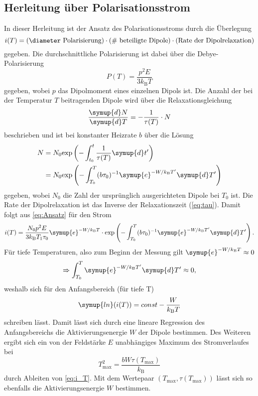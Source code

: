 \subsection{Herleitung über Polarisationsstrom}
In dieser Herleitung ist der Ansatz des Polarisationsstroms durch die Überlegung 
\begin{equation}
    \label{eq:Ansatz}
    i(T) = \text{(\diameter Polarisierung)} \cdot \text{(\# beteiligte Dipole)} \cdot \text{(Rate der Dipolrelaxation)}
\end{equation} 
gegeben.
Die durchschnittliche Polarisierung ist dabei über die Debye-Polarisierung
\begin{equation*}
    \label{eq:debye}
    P(T) = \frac{p^2 E}{3k_\text{B} T}
\end{equation*}
gegeben, wobei $p$ das Dipolmoment eines einzelnen Dipols ist. Die Anzahl der bei der Temperatur $T$ beitragenden Dipole wird über die Relaxationsgleichung 
\begin{equation*}
\frac{\symup{d}N}{\symup{d}T} = -\frac{1}{\tau(T)} \cdot N
\end{equation*}
beschrieben und ist bei konstanter Heizrate $b$ über die Lösung 
\begin{align*}
N &=  N_0 \text{exp}\left(-\int_{t_0}^t \frac{1}{\tau(T)} \symup{d}t'\right) \\
&= N_0 \text{exp}\left( -\int_{T_0}^T (b\tau_0)^{-1} \symup{e}^{-W/k_\text{B}T'} \symup{d}T' \right)
\end{align*}
gegeben, wobei $N_0$ die Zahl der ursprünglich ausgerichteten Dipole bei $T_0$ ist. 
Die Rate der Dipolrelaxation ist das Inverse der Relaxationszeit (\autoref{eq:tau}).
Damit folgt aus \autoref{eq:Ansatz} für den Strom 
\begin{equation}
    \label{eq:i_T}
    i(T) = \frac{N_0 p^2 E}{3k_\text{B}T_1 \tau_0} \symup{e}^{-W/k_\text{B} T} \cdot \text{exp}\left( -\int_{T_0}^T (b\tau_0)^{-1} \symup{e}^{-W/k_\text{B}T'} \symup{d}T' \right).
\end{equation}
Für tiefe Temperaturen, also zum Beginn der Messung gilt $\symup{e}^{-W/k_\text{B}T} \approx 0$
\begin{equation*}
    \Rightarrow \int_{T_0}^T \symup{e}^{-W/k_\text{B}T'} \symup{d}T' \approx 0,
\end{equation*}
weshalb sich für den Anfangsbereich (für tiefe T)
\begin{equation}
    \label{eq:W1}
    \symup{ln}(i(T)) = const - \frac{W}{k_\text{B}T}
\end{equation}
schreiben lässt. Damit lässt sich durch eine lineare Regression des Anfangsbereichs die Aktivierungsenergie $W$ der Dipole bestimmen.
Des Weiteren ergibt sich ein von der Feldstärke $E$ unabhängiges Maximum des Stromverlaufes bei 
\begin{equation}
    \label{eq:T_max}
    T_\text{max}^2 = \frac{b W \tau(T_\text{max})}{k_\text{B}}
\end{equation}
durch Ableiten von \autoref{eq:i_T}. Mit dem Wertepaar $(T_\text{max}, \tau(T_\text{max}))$ lässt sich so ebenfalls die Aktivierungsenergie $W$ bestimmen.

